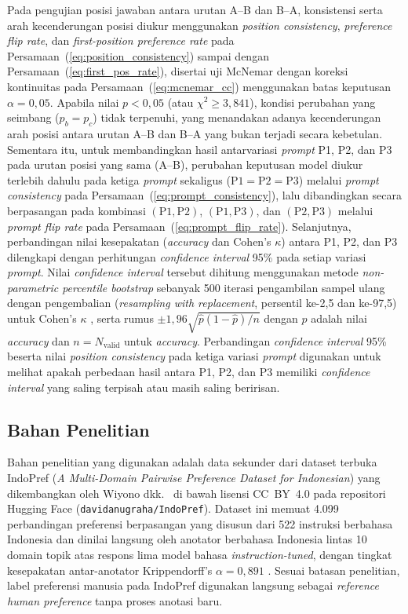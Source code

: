 Pada pengujian posisi jawaban antara urutan A--B dan B--A, konsistensi serta arah kecenderungan posisi diukur menggunakan \textit{position consistency}, \textit{preference flip rate}, dan \textit{first-position preference rate} pada Persamaan~(\ref{eq:position_consistency}) sampai dengan Persamaan~(\ref{eq:first_pos_rate}), disertai uji McNemar dengan koreksi kontinuitas pada Persamaan~(\ref{eq:mcnemar_cc}) menggunakan batas keputusan $\alpha = 0{,}05$. Apabila nilai $p < 0{,}05$ (atau $\chi^2 \ge 3{,}841$), kondisi perubahan yang seimbang ($p_b = p_c$) tidak terpenuhi, yang menandakan adanya kecenderungan arah posisi antara urutan A--B dan B--A yang bukan terjadi secara kebetulan. Sementara itu, untuk membandingkan hasil antarvariasi \textit{prompt} P1, P2, dan P3 pada urutan posisi yang sama (A--B), perubahan keputusan model diukur terlebih dahulu pada ketiga \textit{prompt} sekaligus ($\text{P1} = \text{P2} = \text{P3}$) melalui \textit{prompt consistency} pada Persamaan~(\ref{eq:prompt_consistency}), lalu dibandingkan secara berpasangan pada kombinasi $(\text{P1},\text{P2})$, $(\text{P1},\text{P3})$, dan $(\text{P2},\text{P3})$ melalui \textit{prompt flip rate} pada Persamaan~(\ref{eq:prompt_flip_rate}). Selanjutnya, perbandingan nilai kesepakatan (\textit{accuracy} dan Cohen's $\kappa$) antara P1, P2, dan P3 dilengkapi dengan perhitungan \textit{confidence interval} 95\% pada setiap variasi \textit{prompt}. Nilai \textit{confidence interval} tersebut dihitung menggunakan metode \textit{non-parametric percentile bootstrap} sebanyak 500 iterasi pengambilan sampel ulang dengan pengembalian (\textit{resampling with replacement}, persentil ke-2,5 dan ke-97,5) untuk Cohen's $\kappa$ \cite{raoAgreementMetricsLLMasJudge2026}, serta rumus $\pm 1{,}96\sqrt{\hat{p}(1-\hat{p})/n}$ dengan $\hat{p}$ adalah nilai \textit{accuracy} dan $n = N_{\text{valid}}$ untuk \textit{accuracy}. Perbandingan \textit{confidence interval} 95\% beserta nilai \textit{position consistency} pada ketiga variasi \textit{prompt} digunakan untuk melihat apakah perbedaan hasil antara P1, P2, dan P3 memiliki \textit{confidence interval} yang saling terpisah atau masih saling beririsan.

\subsection{Bahan Penelitian}

Bahan penelitian yang digunakan adalah data sekunder dari dataset terbuka IndoPref (\textit{A Multi-Domain Pairwise Preference Dataset for Indonesian}) yang dikembangkan oleh Wiyono dkk.\ \cite{wiyonoIndoPrefMultiDomainPairwise2025} di bawah lisensi CC~BY~4.0 pada repositori Hugging Face (\texttt{davidanugraha/IndoPref}). Dataset ini memuat 4.099 perbandingan preferensi berpasangan yang disusun dari 522 instruksi berbahasa Indonesia dan dinilai langsung oleh anotator berbahasa Indonesia lintas 10 domain topik atas respons lima model bahasa \textit{instruction-tuned}, dengan tingkat kesepakatan antar-anotator Krippendorff's $\alpha = 0{,}891$ \cite{wiyonoIndoPrefMultiDomainPairwise2025}. Sesuai batasan penelitian, label preferensi manusia pada IndoPref digunakan langsung sebagai \textit{reference human preference} tanpa proses anotasi baru.

